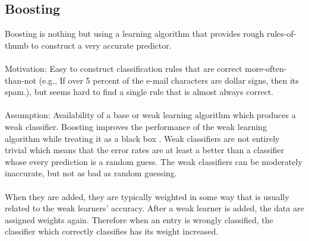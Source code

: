 \subsection{Boosting}
Boosting is nothing but using a learning algorithm that provides rough rules-of-thumb to construct a very accurate predictor.\\
\\ Motivation: Easy to construct classification rules that are correct more-often-than-not (e.g., If over 5 percent of the e-mail characters are dollar signs, then its spam.), but seems hard to find a single rule that is almost always correct.\\
\\ Assumption: Availability of a base or weak learning algorithm which produces a weak classifier. Boosting improves the performance of the weak learning algorithm while treating it as a black box . Weak classifiers are not entirely trivial which means that  the error rates are at least a better than a classifier whose every prediction is a random guess. The weak classifiers can be moderately inaccurate, but not as bad as random guessing. \\
\\When they are added, they are typically weighted in some way that is usually related to the weak learners' accuracy. After a weak learner is added, the data are assigned weights again. Therefore when an entry is wrongly classified, the classifier which correctly classifies has its weight increased. 









